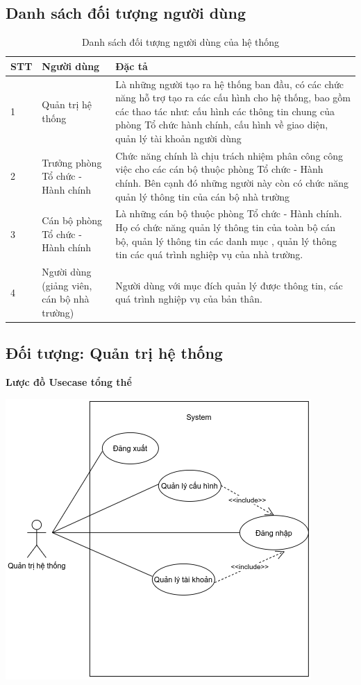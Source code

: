 \subsection{Danh sách đối tượng người dùng}
\begin{table}[H]
    \centering
	\begin{tabular}{|p{1cm}|p{4cm}|p{10cm}|}
    \hline
    \textbf{STT}&\textbf{Người dùng}&\textbf{Đặc tả}\\
	\hline
    1&Quản trị hệ thống&Là những người tạo ra hệ thống ban đầu, có các chức năng hỗ trợ tạo ra các cấu hình cho hệ thống, bao gồm các thao tác như: cấu hình các thông tin chung của phòng Tổ chức hành chính, cấu hình về giao diện, quản lý tài khoản người dùng\\
	\hline
    2&Trưởng phòng Tổ chức - Hành chính&Chức năng chính là chịu trách nhiệm phân công công việc cho các cán bộ thuộc phòng Tổ chức - Hành chính. Bên cạnh đó những người này còn có chức năng quản lý thông tin của cán bộ nhà trường\\
	\hline
    3&Cán bộ phòng Tổ chức - Hành chính&Là những cán bộ thuộc phòng Tổ chức - Hành chính. Họ có chức năng quản lý thông tin của toàn bộ cán bộ, quản lý thông tin các danh mục , quản lý thông tin các quá trình nghiệp vụ của nhà trường.\\
	\hline
	4&Người dùng (giảng viên, cán bộ nhà trường)&Người dùng với mục đích quản lý được thông tin, các quá trình nghiệp vụ của bản thân.\\
	\hline
\end{tabular}
\caption{Danh sách đối tượng người dùng của hệ thống}
\end{table}
\subsection{Đối tượng: Quản trị hệ thống}
\textbf{Lược đồ Usecase tổng thể}
\begin{center}
  \captionsetup{type=figure}
  \includegraphics[scale=0.8]{img/UML/Admin/adminUsecase.png}
\end{center}

